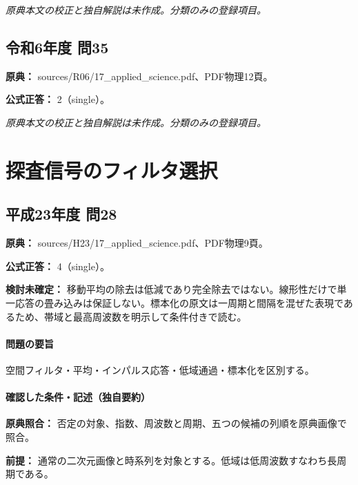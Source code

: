 \par\textit{原典本文の校正と独自解説は未作成。分類のみの登録項目。}

\subsection{令和6年度 問35}
\label{q:r06-reg-applied-35}

\noindent\textbf{原典：} sources/R06/17\_applied\_science.pdf、PDF物理12頁。

\textbf{公式正答：} 2（single）。

\par\textit{原典本文の校正と独自解説は未作成。分類のみの登録項目。}

\section{探査信号のフィルタ選択}

\subsection{平成23年度 問28}
\label{q:h23-reg-applied-28}

\noindent\textbf{原典：} sources/H23/17\_applied\_science.pdf、PDF物理9頁。

\textbf{公式正答：} 4（single）。

\par\textbf{検討未確定：} 移動平均の除去は低減であり完全除去ではない。線形性だけで単一応答の畳み込みは保証しない。標本化の原文は一周期と間隔を混ぜた表現であるため、帯域と最高周波数を明示して条件付きで読む。

\paragraph{問題の要旨} 空間フィルタ・平均・インパルス応答・低域通過・標本化を区別する。

\paragraph{確認した条件・記述（独自要約）}\mbox{}\par

\noindent\textbf{原典照合：} 否定の対象、指数、周波数と周期、五つの候補の列順を原典画像で照合。\par

\noindent\textbf{前提：} 通常の二次元画像と時系列を対象とする。低域は低周波数すなわち長周期である。\par


